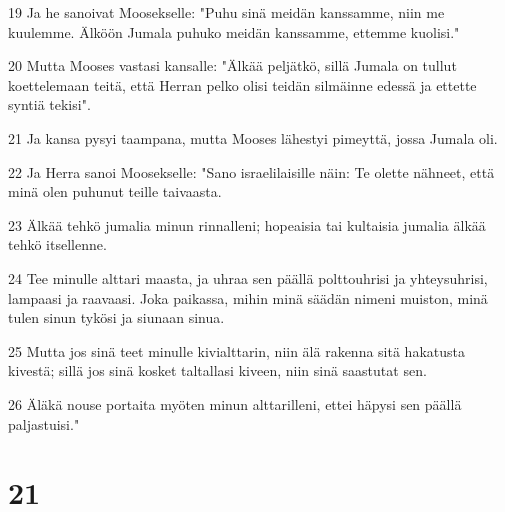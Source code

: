 \par 19 Ja he sanoivat Moosekselle: "Puhu sinä meidän kanssamme, niin me kuulemme. Älköön Jumala puhuko meidän kanssamme, ettemme kuolisi."
\par 20 Mutta Mooses vastasi kansalle: "Älkää peljätkö, sillä Jumala on tullut koettelemaan teitä, että Herran pelko olisi teidän silmäinne edessä ja ettette syntiä tekisi".
\par 21 Ja kansa pysyi taampana, mutta Mooses lähestyi pimeyttä, jossa Jumala oli.
\par 22 Ja Herra sanoi Moosekselle: "Sano israelilaisille näin: Te olette nähneet, että minä olen puhunut teille taivaasta.
\par 23 Älkää tehkö jumalia minun rinnalleni; hopeaisia tai kultaisia jumalia älkää tehkö itsellenne.
\par 24 Tee minulle alttari maasta, ja uhraa sen päällä polttouhrisi ja yhteysuhrisi, lampaasi ja raavaasi. Joka paikassa, mihin minä säädän nimeni muiston, minä tulen sinun tykösi ja siunaan sinua.
\par 25 Mutta jos sinä teet minulle kivialttarin, niin älä rakenna sitä hakatusta kivestä; sillä jos sinä kosket taltallasi kiveen, niin sinä saastutat sen.
\par 26 Äläkä nouse portaita myöten minun alttarilleni, ettei häpysi sen päällä paljastuisi."

\chapter{21}

